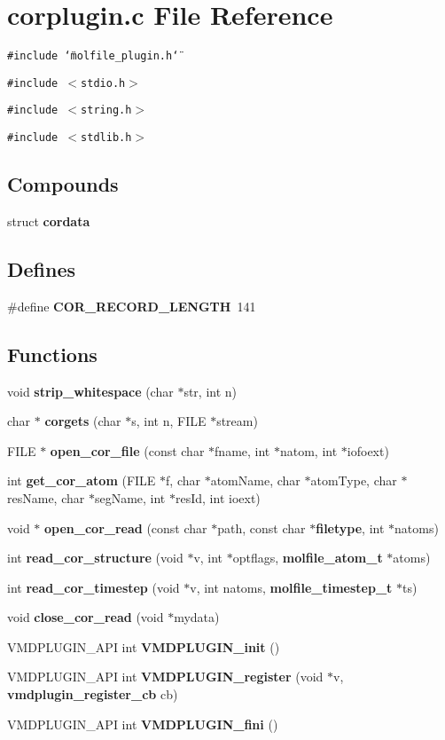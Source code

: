 \section{corplugin.c File Reference}
\label{corplugin_8c}
{\tt \#include \char`\"{}molfile\_\-plugin.h\char`\"{}}\par
{\tt \#include $<$stdio.h$>$}\par
{\tt \#include $<$string.h$>$}\par
{\tt \#include $<$stdlib.h$>$}\par
\subsection*{Compounds}
\begin{CompactItemize}
\item 
struct {\bf cordata}
\end{CompactItemize}
\subsection*{Defines}
\begin{CompactItemize}
\item 
\#define {\bf COR\_\-RECORD\_\-LENGTH}\ 141
\end{CompactItemize}
\subsection*{Functions}
\begin{CompactItemize}
\item 
void {\bf strip\_\-whitespace} (char $\ast$str, int n)
\item 
char $\ast$ {\bf corgets} (char $\ast$s, int n, FILE $\ast$stream)
\item 
FILE $\ast$ {\bf open\_\-cor\_\-file} (const char $\ast$fname, int $\ast$natom, int $\ast$iofoext)
\item 
int {\bf get\_\-cor\_\-atom} (FILE $\ast$f, char $\ast$atom\-Name, char $\ast$atom\-Type, char $\ast$res\-Name, char $\ast$seg\-Name, int $\ast$res\-Id, int ioext)
\item 
void $\ast$ {\bf open\_\-cor\_\-read} (const char $\ast$path, const char $\ast${\bf filetype}, int $\ast$natoms)
\item 
int {\bf read\_\-cor\_\-structure} (void $\ast$v, int $\ast$optflags, {\bf molfile\_\-atom\_\-t} $\ast$atoms)
\item 
int {\bf read\_\-cor\_\-timestep} (void $\ast$v, int natoms, {\bf molfile\_\-timestep\_\-t} $\ast$ts)
\item 
void {\bf close\_\-cor\_\-read} (void $\ast$mydata)
\item 
VMDPLUGIN\_\-API int {\bf VMDPLUGIN\_\-init} ()
\item 
VMDPLUGIN\_\-API int {\bf VMDPLUGIN\_\-register} (void $\ast$v, {\bf vmdplugin\_\-register\_\-cb} cb)
\item 
VMDPLUGIN\_\-API int {\bf VMDPLUGIN\_\-fini} ()
\end{CompactItemize}
